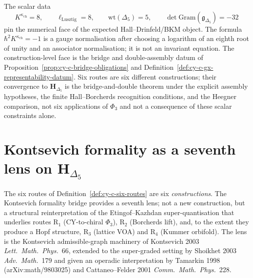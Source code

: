 \begin{remark}
\label{rem:cy-c-six-routes-unified-comparison-scope}
The scalar data
\[
 K^{\kappa_{\mathrm{ch}}}=8,\qquad
 \ell_{\mathrm{Lusztig}}=8,\qquad
 \mathrm{wt}(\Delta_5)=5,\qquad
 \det\mathrm{Gram}(\mathfrak g_{\Delta_5})=-32
\]
pin the numerical face of the expected Hall--Drinfeld/BKM object.  The
formula \(\hbar^2K^{\kappa_{\mathrm{ch}}}=-1\) is a gauge
normalisation after choosing a logarithm of an eighth root of unity and
an associator normalisation; it is not an invariant equation. The
construction-level face is the bridge and double-assembly datum of
Proposition~\ref{prop:cy-c-bridge-obligations} and
Definition~\ref{def:cy-c-gx-representability-datum}. Six routes are
six different constructions; their convergence to
\(\mathbf H_{\Delta_5}\) is the bridge-and-double theorem under the
explicit assembly hypotheses, the finite Hall--Borcherds recognition
conditions, and the Heegner comparison, not six applications of \(\Phi_3\)
and not a consequence of these scalar constraints alone.
\end{remark}

\section{Kontsevich formality as a seventh lens on \texorpdfstring{$\mathbf{H}_{\Delta_5}$}{H-Delta-5}}
\label{sec:cy-c-six-routes-kontsevich-formality}

The six routes of Definition~\ref{def:cy-c-six-routes} are six
\emph{constructions}. The Kontsevich formality bridge provides a
seventh lens; not a new construction, but a structural
reinterpretation of the Etingof--Kazhdan super-quantisation that
underlies routes R$_1$ (CY-to-chiral $\Phi_3$), R$_2$ (Borcherds lift),
and, to the extent they produce a Hopf structure, R$_3$ (lattice VOA)
and R$_4$ (Kummer orbifold). The lens is the Kontsevich
admissible-graph machinery of Kontsevich 2003 \emph{Lett.\ Math.\
Phys.}~66, extended to the super-graded setting by Shoikhet 2003
\emph{Adv.\ Math.}~179 and given an operadic interpretation by
Tamarkin 1998 (arXiv:math/9803025) and Cattaneo--Felder 2001
\emph{Comm.\ Math.\ Phys.}~228.

